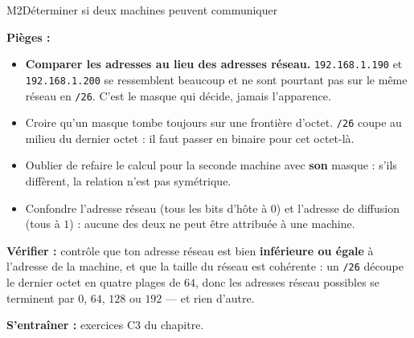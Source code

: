 \begin{fichemethode}{M2}{Déterminer si deux machines peuvent communiquer}

\textbf{Pièges :}
\begin{itemize}
  \item \textbf{Comparer les adresses au lieu des adresses réseau.} \lstinline{192.168.1.190}
    et \lstinline{192.168.1.200} se ressemblent beaucoup et ne sont pourtant pas sur le même
    réseau en \lstinline{/26}. C'est le masque qui décide, jamais l'apparence.
  \item Croire qu'un masque tombe toujours sur une frontière d'octet. \lstinline{/26} coupe
    au milieu du dernier octet : il faut passer en binaire pour cet octet-là.
  \item Oublier de refaire le calcul pour la seconde machine avec \textbf{son} masque : s'ils
    diffèrent, la relation n'est pas symétrique.
  \item Confondre l'adresse réseau (tous les bits d'hôte à $0$) et l'adresse de diffusion
    (tous à $1$) : aucune des deux ne peut être attribuée à une machine.
\end{itemize}

\textbf{Vérifier :} contrôle que ton adresse réseau est bien \textbf{inférieure ou égale} à
l'adresse de la machine, et que la taille du réseau est cohérente : un \lstinline{/26}
découpe le dernier octet en quatre plages de $64$, donc les adresses réseau possibles se
terminent par $0$, $64$, $128$ ou $192$ — et rien d'autre.

\textbf{S'entraîner :} exercices C3 du chapitre.
\end{fichemethode}
